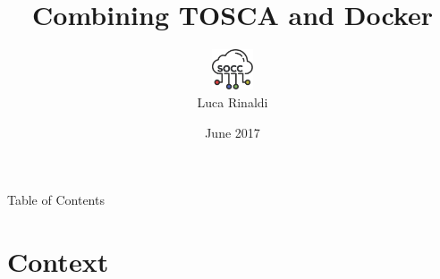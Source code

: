 \documentclass{beamer}
\title[About Beamer] %
{Combining TOSCA and Docker}
\author[lucarin91] %
{\includegraphics[height=1.2cm]{img/socc-logo.png}\\Luca Rinaldi}
\institute[unipi] %
{
  {\small University of Pisa}
}
\date[2017] %
{
  {\small June 2017}
}
\begin{document}
\begin{frame}
  \maketitle
\end{frame}

\begin{frame}{Table of Contents}
  \tableofcontents
\end{frame}

\section{Context}\subsection*{}
\end{document}
